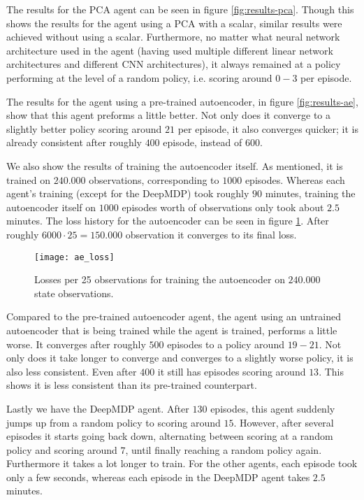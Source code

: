 The results for the PCA agent can be seen in figure \ref{fig:results-pca}. Though this shows the results for the agent using a PCA with a scalar, similar results were achieved without using a scalar. Furthermore, no matter what neural network architecture used in the agent (having used multiple different linear network architectures and different CNN architectures), it always remained at a policy performing at the level of a random policy, i.e. scoring around $0-3$ per episode.

The results for the agent using a pre-trained autoencoder, in figure \ref{fig:results-ae}, show that this agent preforms a little better. Not only does it converge to a slightly better policy scoring around $21$ per episode, it also converges quicker; it is already consistent after roughly $400$ episode, instead of $600$. 

We also show the results of training the autoencoder itself. As mentioned, it is trained on $240.000$ observations, corresponding to $1000$ episodes. Whereas each agent's training (except for the DeepMDP) took roughly $90$ minutes, training the autoencoder itself on $1000$ episodes worth of observations only took about $2.5$ minutes. The loss history for the autoencoder can be seen in figure \ref{fig:ae-loss}. After roughly $6000 \cdot 25 = 150.000$ observation it converges to its final loss.

\begin{figure}[h]
    \centering
    \texttt{[image: ae\_loss]}
    \caption{Losses per 25 observations for training the autoencoder on $240.000$ state observations.}
    \label{fig:ae-loss}
\end{figure}

Compared to the pre-trained autoencoder agent, the agent using an untrained autoencoder that is being trained while the agent is trained, performs a little worse. It converges after roughly $500$ episodes to a policy around $19-21$. Not only does it take longer to converge and converges to a slightly worse policy, it is also less consistent. Even after $400$ it still has episodes scoring around $13$. This shows it is less consistent than its pre-trained counterpart.

Lastly we have the DeepMDP agent. After $130$ episodes, this agent suddenly jumps up from a random policy to scoring around $15$. However, after several episodes it starts going back down, alternating between scoring at a random policy and scoring around $7$, until finally reaching a random policy again. Furthermore it takes a lot longer to train. For the other agents, each episode took only a few seconds, whereas each episode in the DeepMDP agent takes $2.5$ minutes.

